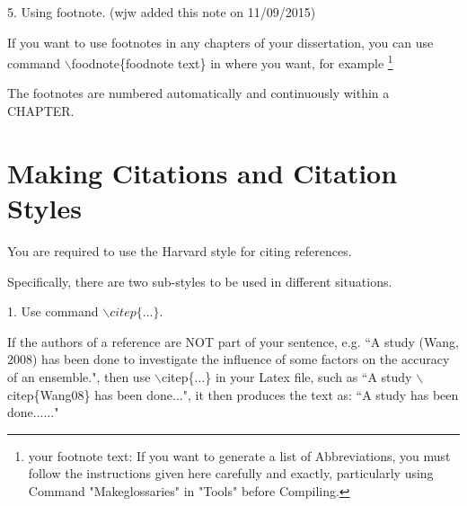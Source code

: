%
% 
%
% 
%
% 
% 
5. Using footnote. (wjw added this note on 11/09/2015)
 
 If you want to use footnotes in any chapters of your dissertation, 
	you can use command $\backslash$foodnote\{foodnote text\} in where you want, for example 
	\footnote{your footnote text: If you want to generate a list of Abbreviations, you must follow the instructions given here carefully and exactly, particularly using Command "Makeglossaries" in "Tools" before Compiling.} 
	
The footnotes are numbered automatically and continuously within a CHAPTER. 

\section {Making Citations and Citation Styles}

You are  required to use the Harvard style for citing references.

Specifically, there are two sub-styles to be used in different situations.

1. Use command $\backslash citep\{...\}$. 

If the authors of a reference are NOT part of your sentence, e.g. ``A study (Wang, 2008) has been done to investigate the influence of some factors on the accuracy of an ensemble.", then use $\backslash$citep\{...\} in your Latex file, such as ``A study $\backslash$citep\{Wang08\} has been done...", it then produces the text as: 
``A study \citep{Wang08} has been done......"

